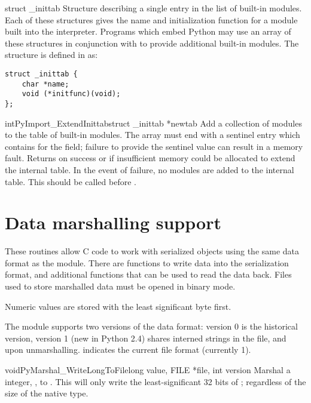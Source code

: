\begin{ctypedesc}[_inittab]{struct _inittab}
  Structure describing a single entry in the list of built-in
  modules.  Each of these structures gives the name and initialization
  function for a module built into the interpreter.  Programs which
  embed Python may use an array of these structures in conjunction
  with  to provide additional
  built-in modules.  The structure is defined in
   as:

\begin{verbatim}
struct _inittab {
    char *name;
    void (*initfunc)(void);
};
\end{verbatim}
\end{ctypedesc}

\begin{cfuncdesc}{int}{PyImport_ExtendInittab}{struct _inittab *newtab}
  Add a collection of modules to the table of built-in modules.  The
   array must end with a sentinel entry which contains
  \NULL{} for the  field; failure to provide the sentinel
  value can result in a memory fault.  Returns  on success or
   if insufficient memory could be allocated to extend the
  internal table.  In the event of failure, no modules are added to
  the internal table.  This should be called before
  .
\end{cfuncdesc}


\section{Data marshalling support \label{marshalling-utils}}

These routines allow C code to work with serialized objects using the
same data format as the  module.  There are functions
to write data into the serialization format, and additional functions
that can be used to read the data back.  Files used to store marshalled
data must be opened in binary mode.

Numeric values are stored with the least significant byte first.

The module supports two versions of the data format: version 0 is the
historical version, version 1 (new in Python 2.4) shares interned
strings in the file, and upon unmarshalling. 
indicates the current file format (currently 1).

\begin{cfuncdesc}{void}{PyMarshal_WriteLongToFile}{long value, FILE *file, int version}
  Marshal a  integer, , to .  This
  will only write the least-significant 32 bits of ;
  regardless of the size of the native  type.

\end{cfuncdesc}

